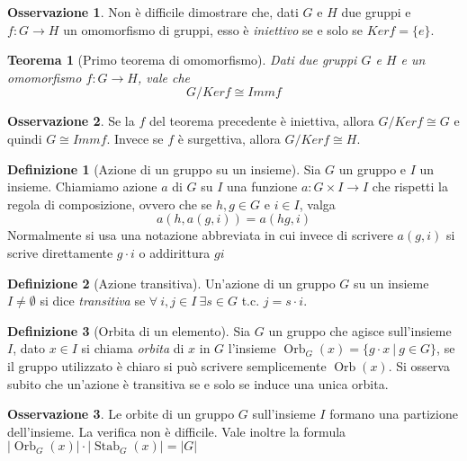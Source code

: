 \documentclass[11pt]{article}
\theoremstyle{plain}
\newtheorem{thm}{Teorema}[section]
\theoremstyle{definition}
\newtheorem{defn}{Definizione}[section]
\newtheorem*{rem}{Osservazione}
\theoremstyle{remark}
\DeclareMathOperator{\Orb}{Orb}
\DeclareMathOperator{\Stab}{Stab}
\begin{document}
\begin{rem}
	Non è difficile dimostrare che, dati $G$ e $H$ due gruppi e $f:G\to H$ un omomorfismo di gruppi, esso è \textit{iniettivo} se e solo se $Ker f = \{e\}$.
\end{rem}


\begin{thm}[Primo teorema di omomorfismo]\label{alg:primo_teo_omo}
	Dati due gruppi $G$ e $H$ e un omomorfismo $f:G\to H$, vale che
	\[ G/Ker f \cong Imm f\]
\end{thm}
\begin{rem}
	Se la $f$ del teorema precedente è iniettiva, allora $G/Ker f\cong G$ e quindi $G\cong Imm f$. Invece se $f$ è surgettiva, allora $G/Ker f\cong H$.
\end{rem}



\begin{defn}[Azione di un gruppo su un insieme] Sia $G$ un gruppo e $I$ un insieme. Chiamiamo azione $a$ di $G$ su $I$ una funzione $a:G\times I \to I$ che rispetti la regola di composizione, ovvero che se $h,g\in G$ e $i \in I$, valga
\[ a(h,a(g,i)) = a(hg, i) \]
Normalmente si usa una notazione abbreviata in cui invece di scrivere $a(g,i)$ si scrive direttamente $g\cdot i$ o addirittura $gi$


\label{defn:azione}
\end{defn}


\begin{defn}[Azione transitiva]
Un'azione di un gruppo $G$ su un insieme $I\neq \emptyset$ si dice \textit{transitiva} se $\forall\ i,j\in I\ \exists s\in G$ t.c. $j=s\cdot i$.
\label{defn:azione transitiva}
\end{defn}


\begin{defn}[Orbita di un elemento]
Sia $G$ un gruppo che agisce sull'insieme $I$, dato $x\in I$ si chiama \textit{orbita} di $x$ in $G$ l'insieme $\Orb_{G}(x)=\{ g\cdot x\ |\ g\in G \}$, se il gruppo utilizzato è chiaro si può scrivere semplicemente $\Orb(x)$. Si osserva subito che un'azione è transitiva se e solo se induce una unica orbita.
\label{defn:orbita}
\end{defn}


\begin{rem} Le orbite di un gruppo $G$ sull'insieme $I$ formano una partizione dell'insieme. La verifica non è difficile. Vale inoltre la formula $|\Orb_G(x)| \cdot |\Stab_G(x)| = |G|$
\end{rem}
\end{document}
